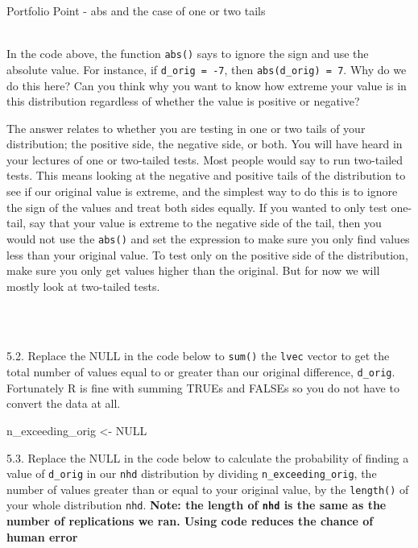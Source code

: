 \documentclass[]{book}
\newenvironment{Shaded}{\begin{snugshade}}{\end{snugshade}}
\newcommand{\NormalTok}[1]{#1}
\newcommand{\OtherTok}[1]{\textcolor[rgb]{0.56,0.35,0.01}{#1}}
\newcommand{\StringTok}[1]{\textcolor[rgb]{0.31,0.60,0.02}{#1}}
\newenvironment{info}
    {
    \hline\\
    }
    { 
    \\\\\hline
    }
\begin{document}
Portfolio Point - abs and the case of one or two tails

\begin{info}
In the code above, the function \texttt{abs()} says to ignore the sign
and use the absolute value. For instance, if \texttt{d\_orig\ =\ -7},
then \texttt{abs(d\_orig)\ =\ 7}. Why do we do this here? Can you think
why you want to know how extreme your value is in this distribution
regardless of whether the value is positive or negative?

The answer relates to whether you are testing in one or two tails of
your distribution; the positive side, the negative side, or both. You
will have heard in your lectures of one or two-tailed tests. Most people
would say to run two-tailed tests. This means looking at the negative
and positive tails of the distribution to see if our original value is
extreme, and the simplest way to do this is to ignore the sign of the
values and treat both sides equally. If you wanted to only test
one-tail, say that your value is extreme to the negative side of the
tail, then you would not use the \texttt{abs()} and set the expression
to make sure you only find values less than your original value. To test
only on the positive side of the distribution, make sure you only get
values higher than the original. But for now we will mostly look at
two-tailed tests.
\end{info}

5.2. Replace the NULL in the code below to \texttt{sum()} the \texttt{lvec} vector to get the total number of values equal to or greater than our original difference, \texttt{d\_orig}. Fortunately R is fine with summing TRUEs and FALSEs so you do not have to convert the data at all.

\begin{Shaded}
\begin{Highlighting}[]
\NormalTok{n_exceeding_orig <-}\StringTok{ }\OtherTok{NULL}
\end{Highlighting}
\end{Shaded}

5.3. Replace the NULL in the code below to calculate the probability of finding a value of \texttt{d\_orig} in our \texttt{nhd} distribution by dividing \texttt{n\_exceeding\_orig}, the number of values greater than or equal to your original value, by the \texttt{length()} of your whole distribution \texttt{nhd}. \textbf{Note: the length of \texttt{nhd} is the same as the number of replications we ran. Using code reduces the chance of human error}
\end{document}
